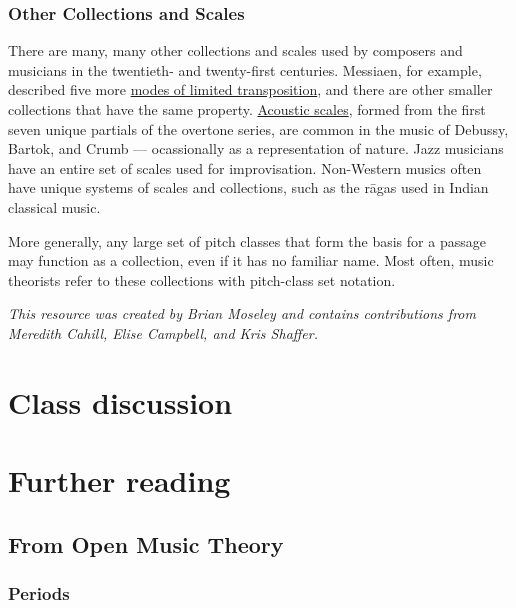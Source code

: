 \documentclass{book}
\begin{document}
\hypertarget{other-collections-and-scales}{%
\subsection{Other Collections and Scales}\label{other-collections-and-scales}}

There are many, many other collections and scales used by composers and
musicians in the twentieth- and twenty-first centuries. Messiaen, for example,
described five more
\href{http://en.wikipedia.org/wiki/Modes_of_limited_transposition}{modes of
limited transposition}, and there are other smaller collections that have the
same property. \href{http://en.wikipedia.org/wiki/Acoustic_scale}{Acoustic
scales}, formed from the first seven unique partials of the overtone series,
are common in the music of Debussy, Bartok, and Crumb --- ocassionally as a
representation of nature. Jazz musicians have an entire set of scales used for
improvisation. Non-Western musics often have unique systems of scales and
collections, such as the rāgas used in Indian classical music.

More generally, any large set of pitch classes that form the basis for a
passage may function as a collection, even if it has no familiar name. Most
often, music theorists refer to these collections with pitch-class set
notation.

\emph{This resource was created by Brian Moseley and contains contributions
from Meredith Cahill, Elise Campbell, and Kris Shaffer.}

\hypertarget{class-discussion-21}{%
\chapter{Class discussion}\label{class-discussion-21}}

\hypertarget{further-reading-10}{%
\chapter{Further reading}\label{further-reading-10}}

\hypertarget{from-open-music-theory-11}{%
\section{From Open Music Theory}\label{from-open-music-theory-11}}

\hypertarget{periods}{%
\subsection{Periods}\label{periods}}
\end{document}
